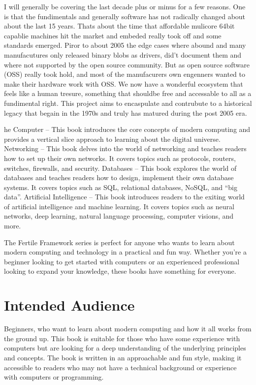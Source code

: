 I will generally be covering the last decade plus or minus for a few reasons. One is that the fundimentals and generally software has not radically changed about about the last 15 years. Thats about the time that affordable mulicore 64bit capablie machines hit the market and embeded really took off and some standards emerged. Piror to about 2005 the edge cases where abound and many manufacutures only released binary blobs as drivers, did’t document them and where not supported by the open source community. But as open source software (OSS) really took hold, and most of the manufacurers own engenners wanted to make their hardware work with OSS. We now have a wonderful ecosystem that feels like a human tresure, something that shouldbe free and accessable to all as a fundimental right. This project aims to encaspulate and contrubute to a historical legacy that begain in the 1970s and truly has matured during the post 2005 era.  

he Computer – This book introduces the core concepts of modern computing and provides a vertical slice approach to learning about the digital universe.
Networking – This book delves into the world of networking and teaches readers how to set up their own networks.  It covers topics such as protocols, routers, switches, firewalls, and security.
Databases – This book explores the world of databases and teaches readers how to design, implement their own database systems. It covers topics such as SQL, relational databases, NoSQL, and “big data”.
Artificial Intelligence – This book introduces readers to the exiting world of artificial intelligence and machine learning. It covers topics such as neural networks, deep learning, natural language processing, computer visions, and more.

The Fertile Framework series is perfect for anyone who wants to learn about modern computing and technology in a practical and fun way. Whether you're a beginner looking to get started with computers or an experienced professional looking to expand your knowledge, these books have something for everyone.

\section*{Intended Audience}

Beginners, who want to learn about modern computing and how it all works from the ground up. This book is suitable for those who have some experience with computers but are looking for a deep understanding of the underlying principles and concepts. The book is written in an approachable and fun style, making it accessible to readers who may not have a technical background or experience with computers or programming.

